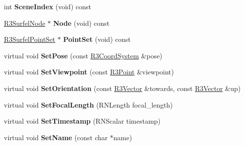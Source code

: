 \begin{DoxyCompactItemize}
\item 
int {\bfseries Scene\+Index} (void) const \hypertarget{class_r3_surfel_scan_a88c6711e9e6ba048c0cad616cca3e2d1}{}\label{class_r3_surfel_scan_a88c6711e9e6ba048c0cad616cca3e2d1}

\item 
\hyperlink{class_r3_surfel_node}{R3\+Surfel\+Node} $\ast$ {\bfseries Node} (void) const \hypertarget{class_r3_surfel_scan_aeefba600143ba1580f8c5a2ba19af89e}{}\label{class_r3_surfel_scan_aeefba600143ba1580f8c5a2ba19af89e}

\item 
\hyperlink{class_r3_surfel_point_set}{R3\+Surfel\+Point\+Set} $\ast$ {\bfseries Point\+Set} (void) const \hypertarget{class_r3_surfel_scan_a9fbc0a5e5b2ddcf6efae9cce609e8d2b}{}\label{class_r3_surfel_scan_a9fbc0a5e5b2ddcf6efae9cce609e8d2b}

\item 
virtual void {\bfseries Set\+Pose} (const \hyperlink{class_r3_coord_system}{R3\+Coord\+System} \&pose)\hypertarget{class_r3_surfel_scan_ac19a0bd15a6512fa0b95be049e85d0be}{}\label{class_r3_surfel_scan_ac19a0bd15a6512fa0b95be049e85d0be}

\item 
virtual void {\bfseries Set\+Viewpoint} (const \hyperlink{class_r3_point}{R3\+Point} \&viewpoint)\hypertarget{class_r3_surfel_scan_ab2b55b8ed10befcf34fa9aa811387b80}{}\label{class_r3_surfel_scan_ab2b55b8ed10befcf34fa9aa811387b80}

\item 
virtual void {\bfseries Set\+Orientation} (const \hyperlink{class_r3_vector}{R3\+Vector} \&towards, const \hyperlink{class_r3_vector}{R3\+Vector} \&up)\hypertarget{class_r3_surfel_scan_a2ee699eba3be44785c3e5b2c24f082c1}{}\label{class_r3_surfel_scan_a2ee699eba3be44785c3e5b2c24f082c1}

\item 
virtual void {\bfseries Set\+Focal\+Length} (R\+N\+Length focal\+\_\+length)\hypertarget{class_r3_surfel_scan_ab38c49d41ed154ddf2a0a666b6fc2fd1}{}\label{class_r3_surfel_scan_ab38c49d41ed154ddf2a0a666b6fc2fd1}

\item 
virtual void {\bfseries Set\+Timestamp} (R\+N\+Scalar timestamp)\hypertarget{class_r3_surfel_scan_a9b911637cbfb2ff69f24819e0823bc66}{}\label{class_r3_surfel_scan_a9b911637cbfb2ff69f24819e0823bc66}

\item 
virtual void {\bfseries Set\+Name} (const char $\ast$name)\hypertarget{class_r3_surfel_scan_a42e40bd5fd81612c9f8a979fb02c98e9}{}\label{class_r3_surfel_scan_a42e40bd5fd81612c9f8a979fb02c98e9}


\end{DoxyCompactItemize}
